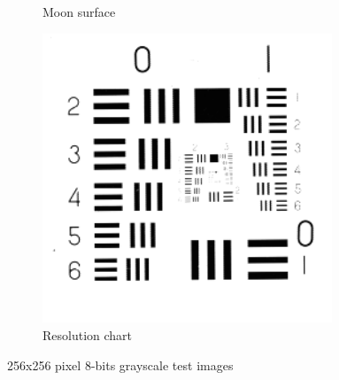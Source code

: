 \begin{figure}
\begin{subfigure}[b]{.3\textwidth}
  \caption{Moon surface}
  \label{fig:test-images-moonsurface}
\end{subfigure}
\begin{subfigure}[b]{.3\textwidth}
  \centering
  \includegraphics[width=0.95\textwidth]{figures/test-images/original/resolutionchart}
  \caption{Resolution chart}
  \label{fig:test-images-resolutionchart}
\end{subfigure}
\caption{256x256 pixel 8-bits grayscale test images \cite{USC:SIPI}}
\label{fig:test-images}
\end{figure}




